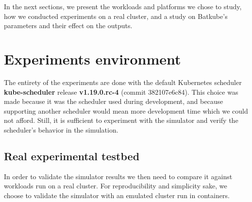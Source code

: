 \documentclass[12pt, a4paper]{memoir}
\begin{document}
In the next sections, we present the workloads and platforms we chose to study,
how we conducted experiments on a real cluster, and a study on Batkube's
parameters and their effect on the outputs.

\section{Experiments environment}

The entirety of the experiments are done with the default Kubernetes scheduler
\textbf{kube-scheduler} release \textbf{v1.19.0.rc-4} (commit 382107e6c84).
This choice was made because it was the scheduler used during development, and
because supporting another scheduler would mean more development time which we
could not afford. Still, it is sufficient to experiment with the simulator and
verify the scheduler's behavior in the simulation.


% 

\subsection{Real experimental testbed}

In order to validate the simulator results we then need to compare it against
workloads run on a real cluster. For reproducibility and simplicity sake, we
choose to validate the simulator with an emulated cluster run in
containers.\\
\end{document}
